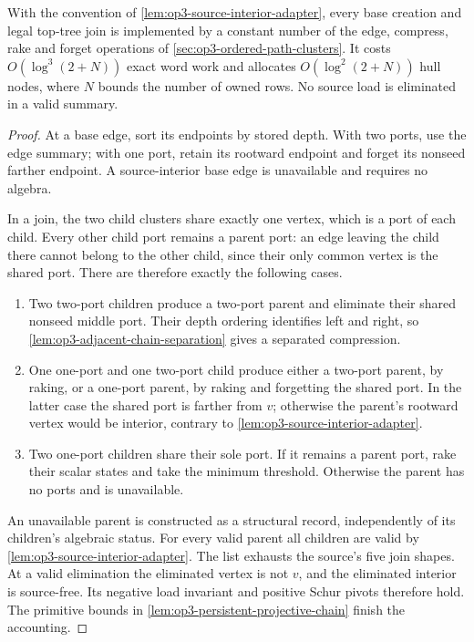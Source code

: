 \begin{lemma}
\label{lem:op3-top-tree-callback-closure}
With the convention of \cref{lem:op3-source-interior-adapter}, every base
creation and legal top-tree join is implemented by a constant number of the
edge, compress, rake and forget operations of
\cref{sec:op3-ordered-path-clusters}. It costs
$O(\log^3(2+N))$ exact word work and allocates
$O(\log^2(2+N))$ hull nodes, where $N$ bounds the number of owned rows.
No source load is eliminated in a valid summary.
\end{lemma}
\begin{proof}
At a base edge, sort its endpoints by stored depth. With two ports, use the
edge summary; with one port, retain its rootward endpoint and forget its
nonseed farther endpoint. A source-interior base edge is unavailable and
requires no algebra.

In a join, the two child clusters share exactly one vertex, which is a port
of each child. Every other child port remains a parent port: an edge leaving
the child there cannot belong to the other child, since their only common
vertex is the shared port. There are therefore exactly the following cases.
\begin{enumerate}
\item Two two-port children produce a two-port parent and eliminate their
shared nonseed middle port. Their depth ordering identifies left and right,
so \cref{lem:op3-adjacent-chain-separation} gives a separated compression.
\item One one-port and one two-port child produce either a two-port parent,
by raking, or a one-port parent, by raking and forgetting the shared port.
In the latter case the shared port is farther from $v$; otherwise the
parent's rootward vertex would be interior, contrary to
\cref{lem:op3-source-interior-adapter}.
\item Two one-port children share their sole port. If it remains a parent
port, rake their scalar states and take the minimum threshold. Otherwise
the parent has no ports and is unavailable.
\end{enumerate}
An unavailable parent is constructed as a structural record, independently
of its children's algebraic status. For every valid parent all children
are valid by \cref{lem:op3-source-interior-adapter}. The list exhausts the
source's five join shapes. At a valid elimination the eliminated vertex is
not $v$, and the eliminated interior is source-free. Its negative load
invariant and positive Schur pivots therefore hold. The primitive bounds in
\cref{lem:op3-persistent-projective-chain} finish the accounting.
\end{proof}

